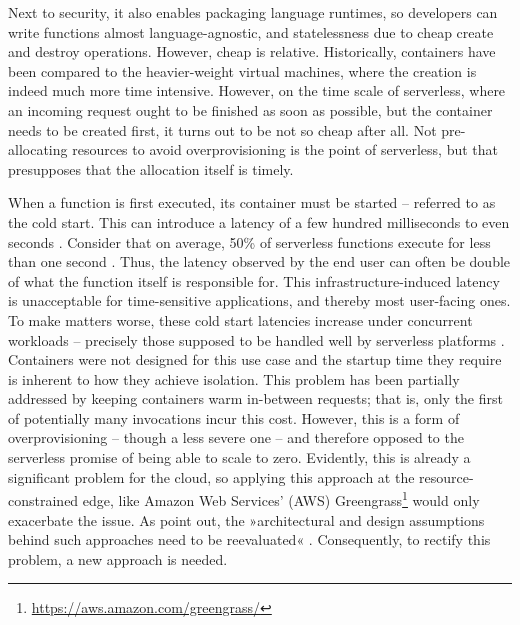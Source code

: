 Next to security, it also enables packaging language runtimes, so developers can write functions almost language-agnostic, and statelessness due to cheap create and destroy operations. However, cheap is relative. Historically, containers have been compared to the heavier-weight virtual machines, where the creation is indeed much more time intensive. However, on the time scale of serverless, where an incoming request ought to be finished as soon as possible, but the container needs to be created first, it turns out to be not so cheap after all. Not pre-allocating resources to avoid overprovisioning is the point of serverless, but that presupposes that the allocation itself is timely.

When a function is first executed, its container must be started -- referred to as the cold start. This can introduce a latency of a few hundred milliseconds to even seconds \cite{Manner2018, Wang2018}. Consider that on average, 50\% of serverless functions execute for less than one second \cite{Shahrad2020}. Thus, the latency observed by the end user can often be double of what the function itself is responsible for. This infrastructure-induced latency is unacceptable for time-sensitive applications, and thereby most user-facing ones.
To make matters worse, these cold start latencies increase under concurrent workloads -- precisely those supposed to be handled well by serverless platforms \cite{Mohan2019}. Containers were not designed for this use case and the startup time they require is inherent to how they achieve isolation.
This problem has been partially addressed by keeping containers warm in-between requests; that is, only the first of potentially many invocations incur this cost. However, this is a form of overprovisioning -- though a less severe one -- and therefore opposed to the serverless promise of being able to scale to zero.
Evidently, this is already a significant problem for the cloud, so applying this approach at the resource-constrained edge, like Amazon Web Services' (AWS) Greengrass\footnote{\url{https://aws.amazon.com/greengrass/}} would only exacerbate the issue.
As \citeauthor{Nastic2018} point out, the »architectural and design assumptions behind such approaches need to be reevaluated« \cite{Nastic2018}. Consequently, to rectify this problem, a new approach is needed.


